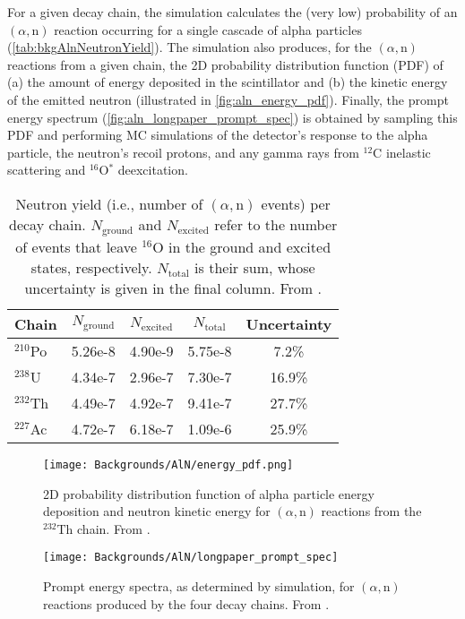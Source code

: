 \documentclass[../thesis.tex]{subfiles}
\begin{document}
For a given decay chain, the simulation calculates the (very low) probability of an $(\alpha,\mathrm{n})$ reaction occurring for a single cascade of alpha particles (\autoref{tab:bkgAlnNeutronYield}). The simulation also produces, for the $(\alpha,\mathrm{n})$ reactions from a given chain, the 2D probability distribution function (PDF) of (a) the amount of energy deposited in the scintillator and (b) the kinetic energy of the emitted neutron (illustrated in \autoref{fig:aln_energy_pdf}). Finally, the prompt energy spectrum (\autoref{fig:aln_longpaper_prompt_spec}) is obtained by sampling this PDF and performing MC simulations of the detector's response to the alpha particle, the neutron's recoil protons, and any gamma rays from $^{12}$C inelastic scattering and $^{16}$O$^*$ deexcitation.

\begin{table}[ht]
  \begin{tabular}{lcccc}
    \toprule
    Chain & $N_{\mathrm{ground}}$ & $N_{\mathrm{excited}}$ & $N_{\mathrm{total}}$ & Uncertainty  \\
    \midrule
    $^{210}$Po & 5.26e-8 & 4.90e-9 & 5.75e-8 & 7.2\%  \\
    $^{238}$U  & 4.34e-7 & 2.96e-7 & 7.30e-7 & 16.9\% \\
    $^{232}$Th & 4.49e-7 & 4.92e-7 & 9.41e-7 & 27.7\% \\
    $^{227}$Ac & 4.72e-7 & 6.18e-7 & 1.09e-6 & 25.9\% \\
    \bottomrule
  \end{tabular}
  \caption{Neutron yield (i.e., number of $(\alpha,\mathrm{n})$ events) per decay chain. $N_{\mathrm{ground}}$ and $N_{\mathrm{excited}}$ refer to the number of events that leave $^{16}$O in the ground and excited states, respectively. $N_{\mathrm{total}}$ is their sum, whose uncertainty is given in the final column. From \cite{Zhao_2014}.}
  \label{tab:bkgAlnNeutronYield}
\end{table}

\begin{figure}[ht]
  \texttt{[image: Backgrounds/AlN/energy\_pdf.png]}
  \caption{2D probability distribution function of alpha particle energy deposition and neutron kinetic energy for $(\alpha,\mathrm{n})$ reactions from the $^{232}$Th chain. From \cite{Zhao_2014}.}
  \label{fig:aln_energy_pdf}
\end{figure}

\begin{figure}[ht]
  \texttt{[image: Backgrounds/AlN/longpaper\_prompt\_spec]}
  \caption{Prompt energy spectra, as determined by simulation, for $(\alpha,\mathrm{n})$ reactions produced by the four decay chains. From \cite{An_2017}.}
  \label{fig:aln_longpaper_prompt_spec}
\end{figure}
\end{document}
